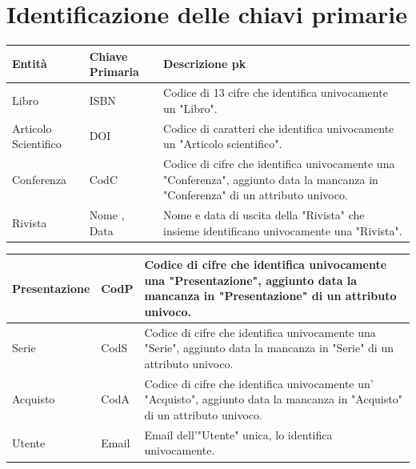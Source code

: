     \section{Identificazione delle chiavi primarie}
   \begin{center}
   \label{sec:PK}

    \begin{tabular}{ | m{5cm} | m{5cm}| m{6cm} | } 
        \hline
             {\bf Entità} & {\bf Chiave Primaria}  & {\bf Descrizione pk}\\ 
         \hline 

              Libro &  ISBN  & Codice di 13 cifre che identifica univocamente un "Libro".\\ 
        \hline
              Articolo Scientifico & DOI & Codice di caratteri che identifica univocamente un "Articolo scientifico".\\ 
        \hline
            Conferenza &  CodC  & Codice di cifre che identifica univocamente una "Conferenza", aggiunto data la mancanza in "Conferenza" di un attributo univoco.\\ 
       \hline
      
           Rivista & Nome , Data & Nome e data di uscita della "Rivista" che insieme identificano univocamente una "Rivista".\\ 
        \hline
            \end{tabular}
       \begin{tabular}{ | m{5cm} | m{5cm}| m{6cm} | } 
       \hline
           Presentazione  & CodP & Codice di cifre che identifica univocamente una "Presentazione", aggiunto data la mancanza in "Presentazione" di un attributo univoco.\\ 
        \hline
           Serie & CodS & Codice di cifre che identifica univocamente una "Serie", aggiunto data la mancanza in "Serie" di un attributo univoco.\\ 
     
       \hline
           Acquisto & CodA & Codice di cifre che identifica univocamente un' "Acquisto", aggiunto data la mancanza in "Acquisto" di un attributo univoco.\\ 
        \hline
           Utente & Email & Email dell'"Utente" unica, lo identifica univocamente.\\ 
        \hline
       
     \end{tabular}
 \end{center}
 
    \newpage
